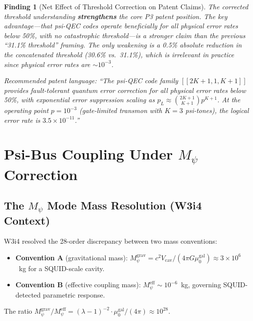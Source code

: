 \documentclass[11pt]{article}
\newtheorem{finding}[theorem]{Finding}
\theoremstyle{definition}
\theoremstyle{remark}
\begin{document}
\begin{finding}[Net Effect of Threshold Correction on Patent Claims]
\label{finding:net-effect}
The corrected threshold understanding \textbf{strengthens} the core P3 patent
position.  The key advantage---that psi-QEC codes operate beneficially for all
physical error rates below 50\%, with no catastrophic threshold---is a stronger
claim than the previous ``31.1\% threshold'' framing.  The only weakening is a
0.5\% absolute reduction in the concatenated threshold (30.6\% vs.\ 31.1\%),
which is irrelevant in practice since physical error rates are $\sim 10^{-3}$.

Recommended patent language: ``The psi-QEC code family $[[2K+1,1,K+1]]$
provides fault-tolerant quantum error correction for all physical error
rates below 50\%, with exponential error suppression scaling as
$p_L \approx \binom{2K+1}{K+1} p^{K+1}$.  At the operating point
$p = 10^{-3}$ (gate-limited transmon with $K=3$ psi-tones), the logical
error rate is $3.5 \times 10^{-11}$.''
\end{finding}

\section{Psi-Bus Coupling Under $M_\psi$ Correction}
\label{sec:mpsi}

\subsection{The $M_\psi$ Mode Mass Resolution (W3i4 Context)}
\label{sec:mpsi-context}

W3i4 resolved the 28-order discrepancy between two mass conventions:
\begin{itemize}
  \item \textbf{Convention A} (gravitational mass):
    $M_\psi^{\mathrm{grav}} = c^2 V_{\mathrm{cav}} / (4\pi G \mu_0^{\mathrm{gal}})
    \approx 3\times10^6$~kg for a SQUID-scale cavity.
  \item \textbf{Convention B} (effective coupling mass):
    $M_\psi^{\mathrm{eff}} \sim 10^{-6}$~kg, governing SQUID-detected
    parametric response.
\end{itemize}
The ratio $M_\psi^{\mathrm{grav}} / M_\psi^{\mathrm{eff}} = (\lambda-1)^{-2}
\cdot \mu_0^{\mathrm{gal}} / (4\pi) \approx 10^{28}$.
\end{document}

